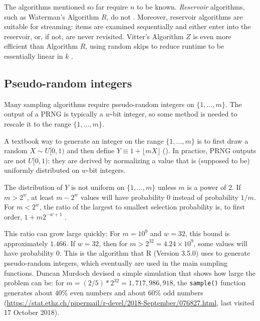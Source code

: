 \documentclass[graybox]{svmult}
\begin{document}
The algorithms mentioned so far require $n$ to be known.
\emph{Reservoir} algorithms, such as Waterman's Algorithm $R$, do not  \cite{knuth_art_1997}.
Moreover, reservoir algorithms are suitable for streaming: items are examined
sequentially and either enter into the reservoir, or, if not, are never revisited.
Vitter's Algorithm $Z$ is even more efficient than Algorithm $R$,
using random skips to reduce runtime to be essentially linear in $k$ \cite{vitter_random_1985}.

\subsection{Pseudo-random integers}
\label{sec:integers}
Many sampling algorithms require pseudo-random integers on $\{1, \ldots, m\}$.
The output of a PRNG is typically a $w$-bit integer, so some method is needed to rescale it to the range $\{1, \ldots, m\}$.

A textbook way to generate an integer on the range $\{1, \ldots, m\}$ is to first draw a random $X \sim U[0,1)$
and then define $Y \equiv 1 + \lfloor mX \rfloor$ (\cite{FIX_ME}). 
In practice, PRNG outputs are not $U[0,1)$: they are derived by normalizing a value that is
 (supposed to be) uniformly distributed on $w$-bit integers. 

The distribution of $Y$ is not uniform on $\{1, \ldots, m\}$ unless $m$ is a power of 2.
If $m > 2^w$, at least $m-2^w$ values will have probability 0 instead of probability $1/m$.
For $m < 2^w$, the ratio of the largest to smallest selection probability is, to first order,  $1+ m 2^{-w+1}$ \cite{knuth_art_1997}.

This ratio can grow large quickly: For $m = 10^9$ and $w=32$, this bound is approximately $1.466$. 
If $w=32$, then for $m>2^{32}=4.24 \times 10^9$, some values will have probability 0. 
This is the algorithm that R (Version 3.5.0) \cite{R_2018} uses to generate pseudo-random integers,
which eventually are used in the main sampling functions.
Duncan Murdoch devised a simple simulation that shows how large the problem can be:
for $m=  (2/5) * 2^32 = 1,717,986,918$, the \texttt{sample()} function generates about 40\% even numbers and about 60\% odd numbers (\url{https://stat.ethz.ch/pipermail/r-devel/2018-September/076827.html}, last visited 17 October 2018).
    
\end{document}
